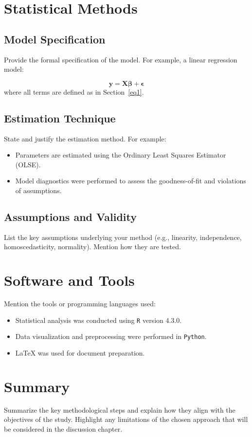 \section{Statistical Methods}
\subsection{Model Specification}
Provide the formal specification of the model. For example, a linear regression model:

\begin{equation}\label{eq:model}
    \bm{y = X\beta + \epsilon}
\end{equation}
where all terms are defined as in Section~\ref{eq1}.

\subsection{Estimation Technique}
State and justify the estimation method. For example:
\begin{itemize}
    \item Parameters are estimated using the Ordinary Least Squares Estimator (OLSE).
    \item Model diagnostics were performed to assess the goodness-of-fit and violations of assumptions.
\end{itemize}

\subsection{Assumptions and Validity}
List the key assumptions underlying your method (e.g., linearity, independence, homoscedasticity, normality). Mention how they are tested.

\section{Software and Tools}
Mention the tools or programming languages used:
\begin{itemize}
    \item Statistical analysis was conducted using \texttt{R} version 4.3.0.
    \item Data visualization and preprocessing were performed in \texttt{Python}.
    \item LaTeX was used for document preparation.
\end{itemize}

\section{Summary}
Summarize the key methodological steps and explain how they align with the objectives of the study. Highlight any limitations of the chosen approach that will be considered in the discussion chapter.